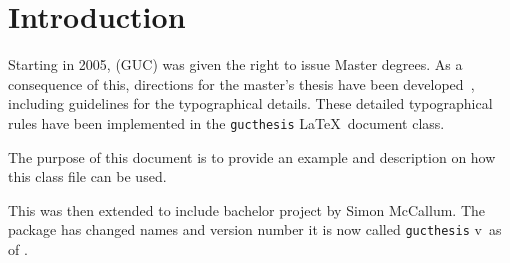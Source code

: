 \chapter{Introduction}
\label{chap:introduction}

Starting in 2005, \GUC (GUC) was given the
right to issue Master degrees. As a consequence of this, directions
for the master's thesis have been developed~\cite{GUCMaster},
including guidelines for the typographical details. These detailed
typographical rules have been implemented in the
\texttt{gucthesis} \LaTeX\ document class.

The purpose of this document is to provide an example and description
on how this class file can be used.

This was then extended to include bachelor project by Simon McCallum.
The package has changed names and version number it is now called
\texttt{gucthesis}
v\gucthesisversion\ as of \gucthesisdate.
